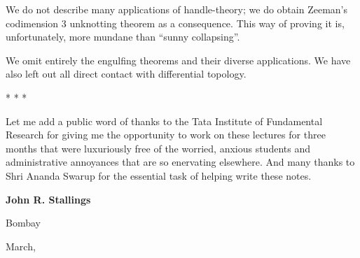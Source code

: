 We do not describe many applications of handle-theory; we do obtain Zeeman's codimension 3 unknotting theorem as a consequence. This way of proving it is, unfortunately, more mundane than ``sunny collapsing''.

We omit entirely the engulfing theorems and their diverse applications. We have also left out all direct contact with differential topology.

\bigskip
\centerline{*\hspace{2cm} *\hspace{2cm} *}
\bigskip

Let me add a public word of thanks to the Tata Institute of Fundamental Research for giving me the opportunity to work on these lectures for three months that were luxuriously free of the worried, anxious students and administrative annoyances that are so enervating elsewhere. And many thanks to Shri Ananda Swarup for the essential task of helping write these notes.

\vskip 1cm

\begin{flushright}
{\large\bf John R. Stallings}

Bombay

March,
\end{flushright}
